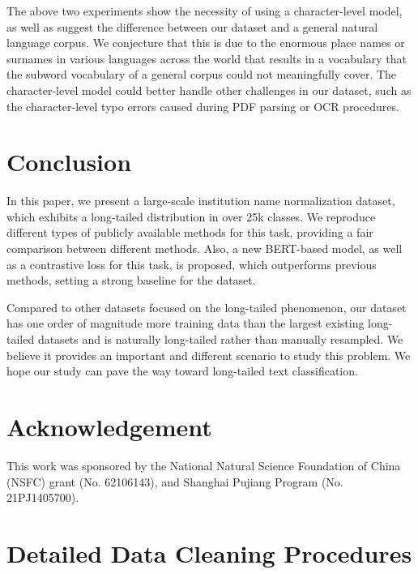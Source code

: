 \documentclass{article}
\begin{document}
The above two experiments show the necessity of using a character-level model, as well as suggest the difference between our dataset and a general natural language corpus. We conjecture that this is due to the enormous place names or surnames in various languages across the world that results in a vocabulary that the subword vocabulary of a general corpus could not meaningfully cover. The character-level model could better handle other challenges in our dataset, such as the character-level typo errors caused during PDF parsing or OCR procedures.

\section{Conclusion}
\label{ssec:layout}

In this paper, we present a large-scale institution name normalization dataset, which exhibits a long-tailed distribution in over 25k classes. We reproduce different types of publicly available methods for this task, providing a fair comparison between different methods. Also, a new BERT-based model, as well as a contrastive loss for this task, is proposed, which outperforms previous methods, setting a strong baseline for the dataset.

Compared to other datasets focused on the long-tailed phenomenon, our dataset has one order of magnitude more training data than the largest existing long-tailed datasets and is naturally long-tailed rather than manually resampled. We believe it provides an important and different scenario to study this problem. We hope our study can pave the way toward long-tailed text classification.

\section*{Acknowledgement}
This work was sponsored by the National Natural Science Foundation of China (NSFC) grant (No.
62106143), and Shanghai Pujiang Program (No. 21PJ1405700).

\clearpage

\vfill\pagebreak








\clearpage
\appendix

\section{Detailed Data Cleaning Procedures} \label{appendixA}
\end{document}
